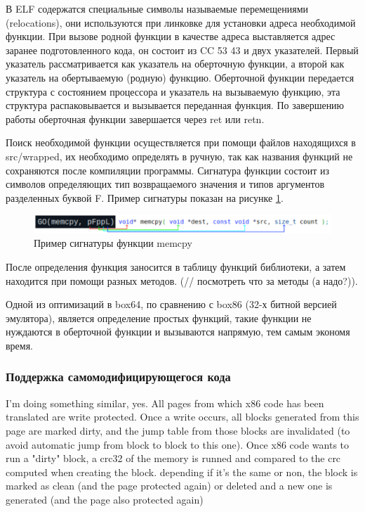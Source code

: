 В ELF содержатся специальные символы называемые перемещениями (relocations), они используются при линковке для установки адреса необходимой функции. При вызове родной функции в качестве адреса выставляется адрес заранее подготовленного кода, он состоит из CC 53 43 и двух указателей. Первый указатель рассматривается как указатель на оберточную функции, а второй как указатель на обертываемую (родную) функцию. Оберточной функции передается структура с состоянием процессора и указатель на вызываемую функцию, эта структура распаковывается и вызывается переданная функция. По завершению работы оберточная функции завершается через ret или retn.

Поиск необходимой функции осуществляется при помощи файлов находящихся в src/wrapped, их необходимо определять в ручную, так как названия функций не сохраняются после компиляции программы. Сигнатура функции состоит из символов определяющих тип возвращаемого значения и типов аргументов разделенных буквой F. Пример сигнатуры показан на рисунке \ref{fig:box64sig}.

\begin{figure}[hbtp]
	\centering
	\includegraphics[width=\textwidth]{img/box64_sig.png}
	\caption{Пример сигнатуры функции memcpy}
	\label{fig:box64sig}
\end{figure}

После определения функция заносится в таблицу функций библиотеки, а затем находится при помощи разных методов. (// посмотреть что за методы (а надо?)).

Одной из оптимизаций в box64, по сравнению с box86 (32-х битной версией эмулятора), является определение простых функций, такие функции не нуждаются в оберточной функции и вызываются напрямую, тем самым экономя время.  \cite{box64_deep}

\subsubsection{Поддержка самомодифицирующегося кода}

I'm doing something similar, yes. All pages from which x86 code has been translated are write protected. Once a write occurs, all blocks generated from this page are marked dirty, and the jump table from those blocks are invalidated (to avoid automatic jump from block to block to this one). Once x86 code wants to run a "dirty" block, a crc32 of the memory is runned and compared to the crc computed when creating the block. depending if it's the same or non, the block is marked as clean (and the page protected again) or deleted and a new one is generated (and the page also protected again)

